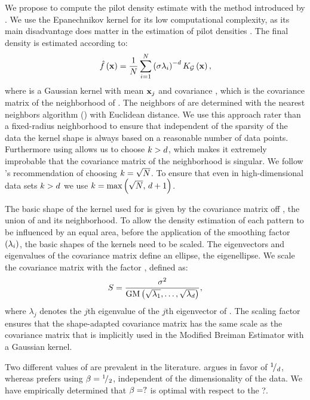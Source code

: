 We propose to compute the pilot density estimate with the method introduced by \citeauthor{wilkinson1995dataplot}. We use the Epanechnikov kernel for its low computational complexity, as its main disadvantage does matter in the estimation of pilot densities \cite{silverman1986density}. 
The final density is estimated according to:
\begin{equation}
	\varEstimatedDensityFunction{\varPattern} = \frac{1}{\varNumPatterns} \sum_{i = 1}^{\varNumPatterns} \left(\varBandwidth\varLocalBandwidth{i}\right)^{-\varDim} \varKernel[\varGaussian]{\varPattern},
\end{equation}
where \varKernel[\varGaussian] is a Gaussian kernel with mean $\varPattern[j]$ and covariance \varCovarianceMatrix, 
which is the covariance matrix of the neighborhood of \varPattern. The neighbors of \varPattern are determined with the \KNNK nearest neighbors algorithm (\KNN) with Euclidean distance. We use this approach rater than a fixed-radius neighborhood to ensure that independent of the sparsity of the data the kernel shape is always based on a reasonable number of data points. Furthermore using \KNN allows us to choose $k > d$, which makes it extremely improbable that the covariance matrix of the neighborhood is singular. We follow \citeauthor{silverman1986density}'s \cite{silverman1986density} recommendation of choosing $k = \sqrt{N}$. To ensure that even in high-dimensional data sets $k > d$ we use 
	$k = \max\left(\sqrt{N},\, d + 1\right)$. 

The basic shape of the kernel used for \varPattern is given by the covariance matrix off \varNeighborhood{\varPattern[i]}, \ie the union of \varPattern and its neighborhood.
To allow the density estimation of each pattern to be influenced by an equal area, before the application of the smoothing factor $(\lambda_{i})$, the basic shapes of the kernels need to be scaled. The eigenvectors and eigenvalues of the covariance matrix define an ellipse, the eigenellipse. We scale the covariance matrix with the factor \varScalingFactor, defined as:
\begin{equation}
	S = \frac{\sigma^2}{\text{GM}\left(\sqrt{\lambda_1}, \dotsc, \sqrt{\lambda_d}\right)},
\end{equation}
where $\lambda_j$ denotes the $j$th eigenvalue of the $j$th eigenvector of \varCovarianceMatrix. The scaling factor \varScalingFactor ensures that the shape-adapted covariance matrix has the same scale as the covariance matrix that is implicitly used in the Modified Breiman Estimator with a Gaussian kernel.

Two different values of \varMBESensitivityParam are prevalent in the literature. \textcite{breiman1977variable} argues in favor of ${}^{1}\!/_{d}$, whereas \textcite{silverman1986density} prefers using $\beta = {}^{1}\!/_{2}$, independent of the dimensionality of the data. We have empirically determined that $\beta = ?$  is optimal with respect to the ?.